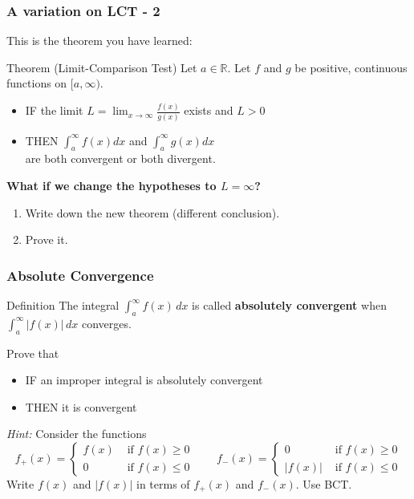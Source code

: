 \documentclass[14pt]{beamer}
\begin{document}
\begin{frame}[t]
	\fontsize{12}{12}\selectfont
	\frametitle{A variation on LCT - 2}

	This is the theorem you have learned:
	\begin{block}{\fontsize{13}{13}\selectfont Theorem (Limit-Comparison Test)}
		Let $\displaystyle a \in \mathbb{R}$. Let $f$ and $g$ be positive, continuous
		functions on $\displaystyle [a, \infty)$.
		\begin{itemize}
			\item IF the limit \; $\displaystyle L = \lim_{x \to \infty}\frac{f(x)}{g(x)}$
				\; exists and \; $\displaystyle L>0$

			\item THEN $\displaystyle \int_{a}^{\infty}\! \! f(x) dx$ \; and \; $\displaystyle
				\int_{a}^{\infty}\! \! g(x) dx$ \\ are both convergent or both divergent.
		\end{itemize}
	\end{block}

	\vspace{.2cm}
	{\bfseries What if we change the hypotheses to $L=\infty$?}
	\begin{enumerate}
		\item Write down the new theorem (different conclusion).

		\item Prove it.
	\end{enumerate}
\end{frame}

\begin{frame}[t]
	\fontsize{12}{12}\selectfont
	\frametitle{Absolute Convergence}
	\vspace{-.3cm}

	\begin{block}{\fontsize{12}{12}\selectfont Definition}
		The integral $\displaystyle \int_{a}^{\infty}f(x)\, dx$ is called \textbf{absolutely
		convergent} when $\displaystyle \int_{a}^{\infty}|f(x)|\, dx$ converges.
	\end{block}

	Prove that
	\begin{itemize}
		\item IF an improper integral is absolutely convergent

		\item THEN it is convergent
	\end{itemize}

	\vspace{.5cm}

	\textit{Hint:} Consider the functions
	\[
		f_{+}(x) =
		\begin{cases}
			f(x) & \text{ if } f(x) \geq 0 \\
			0    & \text{ if } f(x) \leq 0
		\end{cases}
		\quad \quad f_{-}(x) =
		\begin{cases}
			0      & \text{ if }f(x) \geq 0 \\
			|f(x)| & \text{ if }f(x) \leq 0
		\end{cases}
	\]
	Write $f(x)$ and $|f(x)|$ in terms of $f_{+}(x)$ and $f_{-}(x)$. Use BCT.
\end{frame}
\end{document}
